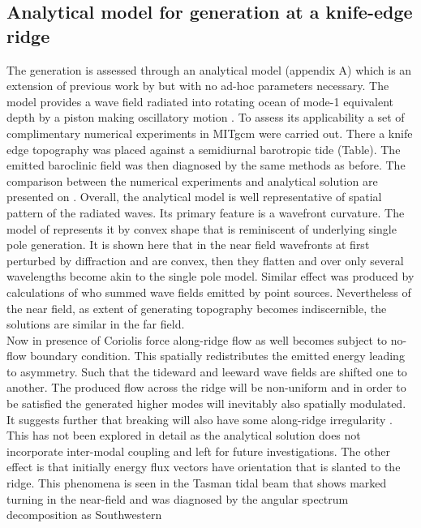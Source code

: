 \documentclass[12pt]{article}
\begin{document}
\subsection{Analytical model for generation at a knife-edge ridge}
The generation is assessed through an analytical model (appendix A) which is an extension of 
previous work by \citep{rainville2010interference} but with no ad-hoc parameters necessary. The 
model provides a wave field radiated into rotating ocean of mode-1 equivalent depth by 
a piston making oscillatory motion \citep{morse1946methods}. To assess its applicability a set of 
complimentary numerical experiments in MITgcm were carried out. There a knife edge topography was 
placed against a semidiurnal barotropic tide (Table). The emitted baroclinic field was then 
diagnosed by the same methods as before. The 
comparison between the numerical experiments and analytical solution are presented on 
. Overall, the analytical model is well representative of spatial pattern of 
the radiated waves. Its primary feature is a wavefront curvature. The model of 
\citep{rainville2010interference} represents it by convex shape that is reminiscent of underlying 
single pole generation. It is shown here that in the near field wavefronts at first perturbed by 
diffraction and are convex, then they flatten and over only several wavelengths become akin to 
the single pole model. Similar effect was produced by calculations of \citep{zhang2011three} who 
summed wave fields emitted by point sources. Nevertheless of the near field, as extent of 
generating topography becomes indiscernible, the solutions are similar in the far field.\\
Now in presence of Coriolis force along-ridge flow as well becomes subject to no-flow boundary 
condition. This spatially redistributes the emitted energy leading to asymmetry. Such that the 
tideward and leeward wave fields are shifted one to another. The produced flow across the ridge 
will be non-uniform and in order to be satisfied the generated higher modes will inevitably also 
spatially modulated. It suggests further that breaking will also have some along-ridge 
irregularity \citep{buhler2007instability}. This has not been explored in detail as the analytical 
solution does not incorporate inter-modal coupling and left for future investigations. The other 
effect is that initially energy flux vectors have orientation that is slanted to the ridge. This 
phenomena is seen in the Tasman tidal beam that shows marked turning in the near-field 
 and was diagnosed by the angular spectrum decomposition as Southwestern 
\end{document}
